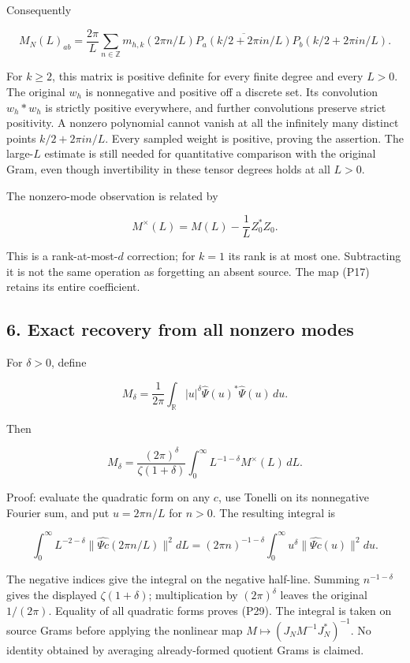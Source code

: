 Consequently

\[
M_N(L)_{ab}=\frac{2\pi}{L}\sum_{n\in\mathbb Z}
m_{h,k}(2\pi n/L)
\overline{P_a(k/2+2\pi i n/L)}P_b(k/2+2\pi i n/L).
\tag{P26b}
\]

For \(k\ge2\), this matrix is positive definite for every finite degree and every \(L>0\). The original \(w_h\) is nonnegative and positive off a discrete set. Its convolution \(w_h*w_h\) is strictly positive everywhere, and further convolutions preserve strict positivity. A nonzero polynomial cannot vanish at all the infinitely many distinct points \(k/2+2\pi i n/L\). Every sampled weight is positive, proving the assertion. The large-\(L\) estimate is still needed for quantitative comparison with the original Gram, even though invertibility in these tensor degrees holds at all \(L>0\).

The nonzero-mode observation is related by

\[
M^\times(L)=M(L)-\frac1LZ_0^*Z_0.
\tag{P27}
\]

This is a rank-at-most-\(d\) correction; for \(k=1\) its rank is at most one. Subtracting it is not the same operation as forgetting an absent source. The map (P17) retains its entire coefficient.

\subsection{6. Exact recovery from all nonzero modes}\label{endpoint-periodized_original--exact-recovery-from-all-nonzero-modes}

For \(\delta>0\), define

\[
M_\delta=\frac1{2\pi}\int_{\mathbb R}|u|^\delta
\widehat\Psi(u)^*\widehat\Psi(u)\,du.
\tag{P28}
\]

Then

\[
\boxed{M_\delta=
\frac{(2\pi)^\delta}{\zeta(1+\delta)}
\int_0^\infty L^{-1-\delta}M^\times(L)\,dL.}
\tag{P29}
\]

Proof: evaluate the quadratic form on any \(c\), use Tonelli on its nonnegative Fourier sum, and put \(u=2\pi n/L\) for \(n>0\). The resulting integral is

\[
\int_0^\infty L^{-2-\delta}
\|\widehat{\Psi c}(2\pi n/L)\|^2dL
=(2\pi n)^{-1-\delta}
\int_0^\infty u^\delta\|\widehat{\Psi c}(u)\|^2du.
\tag{P30}
\]

The negative indices give the integral on the negative half-line. Summing \(n^{-1-\delta}\) gives the displayed \(\zeta(1+\delta)\); multiplication by \((2\pi)^\delta\) leaves the original \(1/(2\pi)\). Equality of all quadratic forms proves (P29). The integral is taken on source Grams before applying the nonlinear map \(M\mapsto(J_NM^{-1}J_N^*)^{-1}\). No identity obtained by averaging already-formed quotient Grams is claimed.

